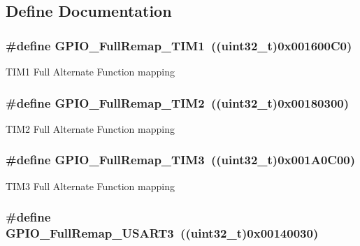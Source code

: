 \subsection{Define Documentation}
\hypertarget{group__GPIO__Remap__define_gaf1f2d5cbc2281b3e3a6cc51c3fe7f77f}{
\subsubsection[{GPIO\_\-FullRemap\_\-TIM1}]{\setlength{\rightskip}{0pt plus 5cm}\#define GPIO\_\-FullRemap\_\-TIM1~((uint32\_\-t)0x001600C0)}}
\label{group__GPIO__Remap__define_gaf1f2d5cbc2281b3e3a6cc51c3fe7f77f}
TIM1 Full Alternate Function mapping \hypertarget{group__GPIO__Remap__define_ga2bd999e77236155935d2a598d4bac2a9}{
\subsubsection[{GPIO\_\-FullRemap\_\-TIM2}]{\setlength{\rightskip}{0pt plus 5cm}\#define GPIO\_\-FullRemap\_\-TIM2~((uint32\_\-t)0x00180300)}}
\label{group__GPIO__Remap__define_ga2bd999e77236155935d2a598d4bac2a9}
TIM2 Full Alternate Function mapping \hypertarget{group__GPIO__Remap__define_ga8ba8cef32c5076db1872e173f873dae6}{
\subsubsection[{GPIO\_\-FullRemap\_\-TIM3}]{\setlength{\rightskip}{0pt plus 5cm}\#define GPIO\_\-FullRemap\_\-TIM3~((uint32\_\-t)0x001A0C00)}}
\label{group__GPIO__Remap__define_ga8ba8cef32c5076db1872e173f873dae6}
TIM3 Full Alternate Function mapping \hypertarget{group__GPIO__Remap__define_gaa8831190b5b68e9f871955b791fa358b}{
\subsubsection[{GPIO\_\-FullRemap\_\-USART3}]{\setlength{\rightskip}{0pt plus 5cm}\#define GPIO\_\-FullRemap\_\-USART3~((uint32\_\-t)0x00140030)}}
